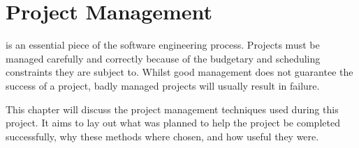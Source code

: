 \chapter[Project Management]{Project Management}
\label{ch:pm}


 is an essential piece of the software engineering process.
Projects must be managed carefully and correctly because of the budgetary and scheduling
constraints they are subject to. Whilst good management does not guarantee the success of
a project, badly managed projects will usually result in failure.

This chapter will discuss the project management techniques used during this project.
It aims to lay out what was planned to help the project be completed successfully, why
these methods where chosen, and how useful they were.












